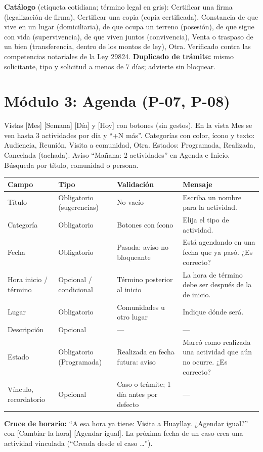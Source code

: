 \documentclass[11pt,a4paper]{article}
\begin{document}
\textbf{Catálogo} (etiqueta cotidiana; término legal en gris): Certificar una firma (legalización de firma), Certificar una copia (copia certificada), Constancia de que vive en un lugar (domiciliaria), de que ocupa un terreno (posesión), de que sigue con vida (supervivencia), de que viven juntos (convivencia), Venta o traspaso de un bien (transferencia, dentro de los montos de ley), Otra. Verificado contra las competencias notariales de la Ley 29824. \textbf{Duplicado de trámite:} mismo solicitante, tipo y solicitud a menos de 7 días; advierte sin bloquear.

\section{Módulo 3: Agenda (P-07, P-08)}
Vistas [Mes] [Semana] [Día] y [Hoy] con botones (sin gestos). En la vista Mes se ven hasta 3 actividades por día y ``+N más''. Categorías con color, ícono y texto: Audiencia, Reunión, Visita a comunidad, Otra. Estados: Programada, Realizada, Cancelada (tachada). Aviso ``Mañana: 2 actividades'' en Agenda e Inicio. Búsqueda por título, comunidad o persona.

\begin{small}
\begin{longtable}{|L{3cm}|L{2.6cm}|L{4.4cm}|L{5.2cm}|}\hline
\textbf{Campo} & \textbf{Tipo} & \textbf{Validación} & \textbf{Mensaje}\\\hline\endhead
Título & Obligatorio (sugerencias) & No vacío & Escriba un nombre para la actividad.\\\hline
Categoría & Obligatorio & Botones con ícono & Elija el tipo de actividad.\\\hline
Fecha & Obligatorio & Pasada: aviso no bloqueante & Está agendando en una fecha que ya pasó. ¿Es correcto?\\\hline
Hora inicio / término & Opcional / condicional & Término posterior al inicio & La hora de término debe ser después de la de inicio.\\\hline
Lugar & Obligatorio & Comunidades u otro lugar & Indique dónde será.\\\hline
Descripción & Opcional & — & —\\\hline
Estado & Obligatorio (Programada) & Realizada en fecha futura: aviso & Marcó como realizada una actividad que aún no ocurre. ¿Es correcto?\\\hline
Vínculo, recordatorio & Opcional & Caso o trámite; 1 día antes por defecto & —\\\hline
\end{longtable}
\end{small}
\textbf{Cruce de horario:} ``A esa hora ya tiene: Visita a Huayllay. ¿Agendar igual?'' con [Cambiar la hora] [Agendar igual]. La próxima fecha de un caso crea una actividad vinculada (``Creada desde el caso …'').
\end{document}
